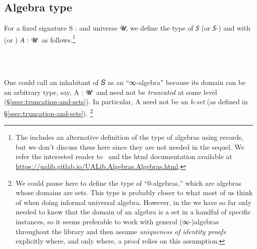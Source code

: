 \documentclass[a4paper,UKenglish,cleveref,autoref,thm-restate]{lipics-v2021}
\begin{document}
\subsection{Algebra type}\label{ssec:algebra-type}
For a fixed signature \ab S \as : \sigOV and universe \ab 𝓤, we define the type of  \ab 𝑆 (or \ab 𝑆-) and with  (or ) \ab 𝐴 \as : \ab 𝓤 \as ̇ as follows.\footnote{The \agdaualib includes an alternative definition of the type of algebras using records, but we don't discuss these here since they are not needed in the sequel. We refer the interested reader to~\cite{DeMeo:2021} and the html documentation available at \url{https://ualib.gitlab.io/UALib.Algebras.Algebras.html}.}
\ccpad
\begin{code}%
\>[0]\AgdaSpace{}%
\AgdaSymbol{:}\AgdaSpace{}%
\AgdaSymbol{(}\AgdaSpace{}%
\AgdaSymbol{:}\AgdaSpace{}%
\AgdaSymbol{)(}\AgdaSpace{}%
\AgdaSymbol{:}\AgdaSpace{}%
\AgdaSpace{}%
\AgdaSpace{}%
\AgdaSymbol{)}\AgdaSpace{}%
%
\>[50]\AgdaSpace{}%
\AgdaSpace{}%
\AgdaSpace{}%
\AgdaSpace{}%
\AgdaSpace{}%
\AgdaSpace{}%
\<%
\\
%
\\[\AgdaEmptyExtraSkip]%
\>[0]\AgdaSpace{}%
%
\>[13]\AgdaSpace{}%
\AgdaSymbol{=}\AgdaSpace{}%
\AgdaSpace{}%
\AgdaSpace{}%
\AgdaSpace{}%
\AgdaSpace{}%
\AgdaSpace{}%
\AgdaFunction{,}\AgdaSpace{}%
\AgdaSymbol{((}\AgdaSpace{}%
\AgdaSymbol{:}\AgdaSpace{}%
\AgdaSpace{}%
\AgdaSpace{}%
\AgdaSymbol{)}\AgdaSpace{}%
\AgdaSpace{}%
\AgdaSpace{}%
\AgdaSymbol{(}\AgdaSpace{}%
\AgdaSpace{}%
\AgdaSpace{}%
\AgdaSymbol{)}\AgdaSpace{}%
\AgdaSymbol{)}\<%
\end{code}
\ccpad
One could call an inhabitant of  \ab 𝑆  as an ``∞-algebra'' because its domain can be an arbitrary type, say, \ab A \as : \ab 𝓤 \af ̇ and need not be \emph{truncated} at some level (\S\ref{ssec:truncation-and-sets}). In particular, \ab A need not be an \emph{h-set} (as defined in \S\ref{ssec:truncation-and-sets}).%
%
\footnote{We could pause here to define the type of ``0-algebras,'' which are algebras whose domains are sets. This type is probably closer to what most of us think of when doing informal universal algebra. However, in the \ualib we have so far only needed to know that the domain of an algebra is a set in a handful of specific instances, so it seems preferable to work with general (∞-)algebras throughout the library and then assume \emph{uniqueness of identity proofs} explicitly where, and only where, a proof relies on this assumption.}
\end{document}

